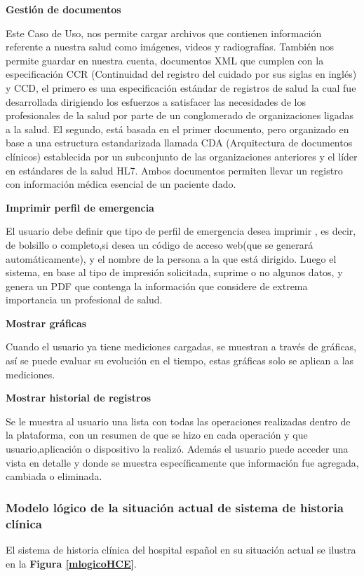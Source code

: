 {\textbf{Gestión de documentos}

	Este Caso de Uso, nos permite cargar archivos que contienen información referente a nuestra salud como imágenes, videos y radiografías. También nos permite guardar en nuestra cuenta, documentos XML que cumplen con la especificación CCR (Continuidad del registro del cuidado por sus siglas en inglés) y CCD, el primero es una especificación estándar de registros de salud la cual fue desarrollada dirigiendo los esfuerzos a satisfacer las necesidades de los profesionales de la salud por parte de un conglomerado de organizaciones ligadas a la salud. El segundo, está basada  en el primer documento, pero organizado en base a una estructura estandarizada llamada CDA (Arquitectura de documentos clínicos) establecida por un subconjunto de las organizaciones anteriores y el líder en estándares de la salud HL7. Ambos documentos permiten llevar un registro con información médica esencial de un paciente dado.
    
\textbf{Imprimir perfil de emergencia}

El usuario debe definir que tipo de perfil de emergencia desea imprimir , es decir, de bolsillo o completo,si desea un código de acceso web(que se generará automáticamente), y el nombre de la persona a la que está dirigido. Luego el sistema, en base al tipo de impresión solicitada, suprime o no algunos datos, y genera un PDF que contenga la información que considere de extrema importancia un profesional de salud.

\textbf{Mostrar gráficas}

Cuando el usuario ya tiene mediciones cargadas, se muestran a través de gráficas, así se puede evaluar su evolución en el tiempo, estas gráficas solo se aplican a las mediciones.

\textbf{Mostrar historial de registros}

Se le muestra al usuario una lista con todas las operaciones realizadas dentro de la plataforma, con un resumen de que se hizo en cada operación y que usuario,aplicación o dispositivo la realizó. Además el usuario puede acceder una vista en detalle y donde se muestra específicamente que información fue agregada, cambiada o eliminada.
}

\subsubsection{Modelo lógico de la situación actual de sistema de historia clínica}
El sistema de historia clínica del hospital español en su situación actual se ilustra en la \textbf{Figura \ref{mlogicoHCE}}.



